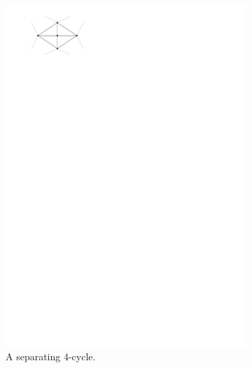 \begin{figure}
\begin{subfigure}[b]{0.1 \textwidth}
          \includegraphics[width = \textwidth]{introduction/img/sep4cycle.pdf}
          \caption{A separating $4$-cycle.}
      \end{subfigure}
      ~
      \begin{subfigure}[b]{0.1 \textwidth}

\end{subfigure}
\end{figure}
